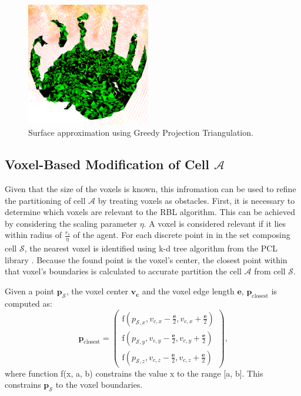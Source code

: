             \begin{figure}[htbp]
                \centering
                \includegraphics[width=0.48\textwidth]{./fig/rviz/triangulation_surface_aprox.png}
                \caption{
                    Surface approximation using Greedy Projection Triangulation.
                }
                \label{fig:triangulation}
            \end{figure}

        \subsection{Voxel-Based Modification of Cell $\mathcal{A}$}
            Given that the size of the voxels is known, this infromation can be used to refine the partitioning of cell $\mathcal{A}$ by treating voxels as obstacles.
            First, it is necessary to determine which voxels are relevant to the \ac{RBL} algorithm.
            This can be achieved by considering the scaling parameter $\eta$.
            A voxel is considered relevant if it lies within radius of $\frac{r_s}{\eta}$ of the agent.
            For each discrete point in  in the set composing cell $\mathcal{S}$, the nearest voxel is identified using k-d tree algorithm from the PCL library \cite{kd_tree}.
            Because the found point is the voxel's center, the closest point within that voxel's boundaries is calculated to accurate partition the cell $\mathcal{A}$ from cell $\mathcal{S}$.

            Given a point $\mathbf{p_{\mathcal{S}}}$, the voxel center $\mathbf{v_c}$ and the voxel edge length $\mathbf{e}$, $\mathbf{p}_{\text{closest}}$ is computed as: 
            \begin{equation}
                \mathbf{p}_{\text{closest}} =
                \begin{pmatrix}
                    \text{f}(p_{\mathcal{S},x}, v_{c,x} - \frac{\mathbf{e}}{2}, v_{c,x} + \frac{\mathbf{e}}{2}) \\
                    \text{f}(p_{\mathcal{S},y}, v_{c,y} - \frac{\mathbf{e}}{2}, v_{c,y} + \frac{\mathbf{e}}{2}) \\
                    \text{f}(p_{\mathcal{S},z}, v_{c,z} - \frac{\mathbf{e}}{2}, v_{c,z} + \frac{\mathbf{e}}{2})
                \end{pmatrix}\text{,}
            \end{equation}
            where function f(x, a, b) constrains the value x to the range [a, b].
            This constrains $\mathbf{p_{\mathcal{S}}}$ to the voxel boundaries.
            

